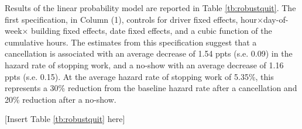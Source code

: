 \documentclass[reviewmode,AEJ]{AEA}
\begin{document}
Results of the linear probability model are reported in Table \ref{tb:robustquit}. 
The first specification, in Column (1), controls for driver fixed effects, hour\(\times\)day-of-week\(\times\) building fixed effects, date fixed effects, and a cubic function of the cumulative hours.
The estimates from this specification suggest that a cancellation is associated with an
average decrease of 1.54 ppts (s.e. 0.09) in the hazard rate of stopping work, and a no-show with an average decrease
of 1.16 ppts (s.e. 0.15). At the average hazard rate of stopping work of 5.35\%, this represents a 30\% reduction from the baseline hazard rate after a cancellation and 20\% reduction after a no-show.

\begin{center}
	[Insert Table \ref{tb:robustquit} here]
\end{center}

\end{document}

